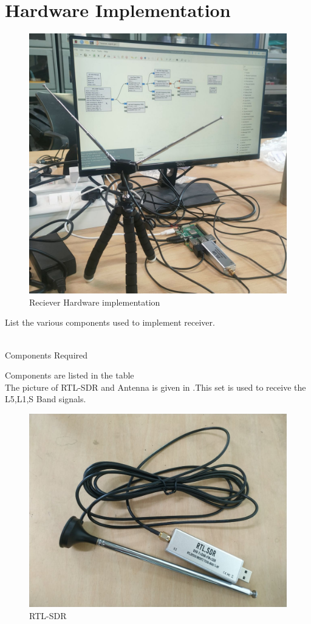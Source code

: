 \documentclass[11pt]{book}
\begin{document}
\section{Hardware Implementation}
\begin{figure}
\includegraphics[scale=0.2]{figs/hardwareimplement.jpg} 
\caption{Reciever Hardware implementation}
\label{fig:rtl-sdr}
\end{figure}
List the various components used to implement receiver.
\\
\solution
\\
\begin{table}[!ht]
  \centering
 
  \caption{Components Required}
  \label{tab:rxcomponents}
\end{table}
Components are listed in the table \\
The picture of RTL-SDR and Antenna is given in .This set is used to receive the L5,L1,S Band  signals.
\begin{figure}[H]
\centering
\includegraphics[width=0.5\columnwidth]{figs/rtl-sdr.png}
\caption{RTL-SDR}
\label{fig:rtl-sdr}
\end{figure}
\end{document}
